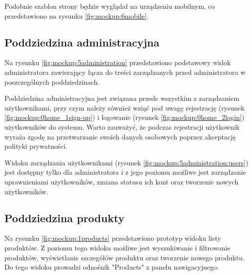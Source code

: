 
Podobnie szablon strony będzie wyglądał na urządzeniu mobilnym, co przedstawiono na rysunku \ref{fig:mockup:6mobile}.


\subsection{Poddziedzina administracyjna}

Na rysunku \ref{fig:mockup:5administration} przedstawiono podstawowy widok administratora zawierający łącza do treści zarządzanych przed administratora w poszczególnych poddziedzinach.


Poddziedzina administracyjna jest związana przede wszystkim z zarządzaniem użytkownikami,
przy czym należy również wziąć pod uwagę rejestrację (rysunek \ref{fig:mockup:0home_1sign-up}) i logowanie (rysunek \ref{fig:mockup:0home_2login}) użytkowników do systemu.
Warto zauważyć, że podczas rejestracji użytkownik wyraża zgodę na przetwarzanie swoich danych osobowych poprzez akceptację polityki prywatności.



Widoku zarządzania użytkownikami (rysunek \ref{fig:mockup:5administration:users}) jest dostępny tylko dla administratora i z jego poziomu możliwe jest zarządzanie uprawnieniami użytkowników, zmiana statusu ich kont oraz tworzenie nowych użytkowników.

\subsection{Poddziedzina produkty}

Na rysunku \ref{fig:mockup:1products} przedstawiono prototyp widoku listy produktów.
Z poziomu tego widoku możliwe jest wyszukiwanie i filtrowanie produktów, wyświetlanie szczegółów produktu oraz tworzenie nowego produktu.
Do tego widoku prowadzi odnośnik "Products" z panelu nawigacyjnego.

